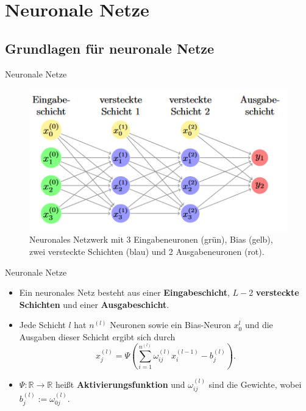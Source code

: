 \section{Neuronale Netze}

\subsection{Grundlagen für neuronale Netze}

\begin{frame}{Neuronale Netze}
    \begin{figure}[htp]
        \centering
        \includegraphics[scale=0.8]{images/neuralnet}
        \caption{Neuronales Netzwerk mit 3 Eingabeneuronen (grün), Bias (gelb), zwei versteckte Schichten
            (blau) und 2 Ausgabeneuronen (rot).}
        \label{neuralNetexample}
    \end{figure}
\end{frame}

\begin{frame}{Neuronale Netze}
    \begin{itemize}
        \item<1-> Ein neuronales Netz besteht aus einer \textbf{Eingabeschicht}, $L-2$ \textbf{versteckte Schichten} und
        einer \textbf{Ausgabeschicht}.
        \item<2-> Jede Schicht $l$ hat $n^{(l)}$ Neuronen sowie ein Bias-Neuron $x_0^{l}$ und die Ausgaben dieser
        Schicht ergibt sich durch
        \[
            x_j^{(l)} = \Psi \left( \sum_{i=1}^{n^{(l)}} \omega_{ij}^{(l)} x_i^{(l-1)} - b_j^{(l)} \right).
        \]
        \item<3-> $\Psi:\mathbb{R} \rightarrow \mathbb{R}$ heißt \textbf{Aktivierungsfunktion} und $\omega_{ij}^{(l)}$
        sind die Gewichte, wobei $b_j^{(l)}:= \omega_{0j}^{(l)}$.
    \end{itemize}
\end{frame}


